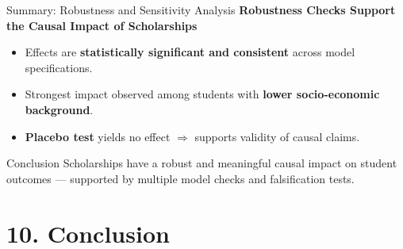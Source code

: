 \documentclass[aspectratio=169]{beamer}
\begin{document}
\begin{frame}{Summary: Robustness and Sensitivity Analysis}
\textbf{Robustness Checks Support the Causal Impact of Scholarships}
\vspace{6pt}
\begin{itemize}[label=--, itemsep=3pt]
    \item Effects are \textbf{statistically significant and consistent} across model specifications.
    \item Strongest impact observed among students with \textbf{lower socio-economic background}.
    \item \textbf{Placebo test} yields no effect $\Rightarrow$ supports validity of causal claims.
\end{itemize}

\vspace{10pt}
\begin{block}{Conclusion}
Scholarships have a robust and meaningful causal impact on student outcomes — supported by multiple model checks and falsification tests.
\end{block}

\end{frame}


\section{10. Conclusion}
\end{document}
